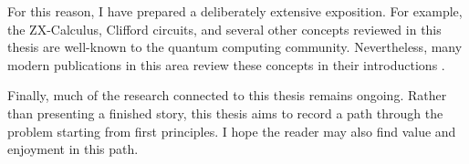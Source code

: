 For this reason, I have prepared a deliberately extensive exposition. For example, the ZX-Calculus, Clifford circuits, and several other concepts reviewed in this thesis are well-known to the quantum computing community. Nevertheless, many modern publications in this area review these concepts in their introductions \cite{circle-graphs,Backens_2021,McElvanney_2023}.

Finally, much of the research connected to this thesis remains ongoing. Rather than presenting a finished story, this thesis aims to record a path through the problem starting from first principles. I hope the reader may also find value and enjoyment in this path.